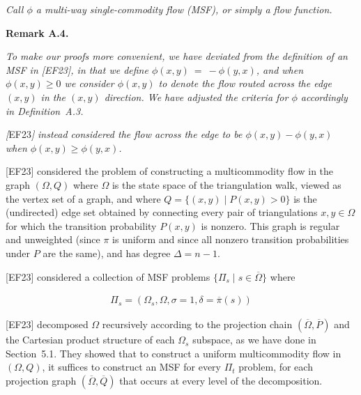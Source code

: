 \emph{Call $\phi$ a multi-way single-commodity flow (MSF), or simply a flow function.}\par







\par\medskip\noindent\textbf{\textbf{Remark A.4}\textbf{.}}\par



\emph{To make our proofs more convenient, we have deviated from the definition of an MSF in [EF23], in that we define $\phi(x,y)~=~-\phi(y,x)$, and when $\phi(x,y)\geq 0$ we consider $\phi(x,y)$ to denote the flow routed across the edge $(x,y)$ in the $(x,y)$ direction. We have adjusted the criteria for $\phi$ accordingly in Definition A.3.}\par




\emph{[}EF23\emph{]}\emph{ instead considered the flow across the edge to be $\phi(x,y)-\phi(y,x)$ when $\phi(x,y)\geq\phi(y,x)$.}\par






[EF23] considered the problem of constructing a multicommodity flow in the graph $(\Omega,Q)$ where $\Omega$ is the state space of the triangulation walk, viewed as the vertex set of a graph, and where $Q=\{(x,y)\mid P(x,y)>0\}$ is the (undirected) edge set obtained by connecting every pair of triangulations $x,y\in\Omega$ for which the transition probability $P(x,y)$ is nonzero. This graph is regular and unweighted (since $\pi$ is uniform and since all nonzero transition probabilities under $P$ are the same), and has degree $\Delta=n-1$.\par




[EF23] considered a collection of MSF problems $\{\Pi_{s}\mid s\in\overline{\Omega}\}$ where\par


\[\begin{gathered}
\Pi_{s}=\left(\Omega_{s},\Omega,\sigma=1,\delta=\overline{\pi}(s)\right)
\end{gathered}\]




[EF23] decomposed $\Omega$ recursively according to the projection chain $(\overline{\Omega},\overline{P})$ and the Cartesian product structure of each $\Omega_{s}$ subspace, as we have done in Section 5.1. They showed that to construct a uniform multicommodity flow in $(\Omega,Q)$, it suffices to construct an MSF for every $\Pi_{t}$ problem, for each projection graph $(\overline{\Omega},\overline{Q})$ that occurs at every level of the decomposition.\par




